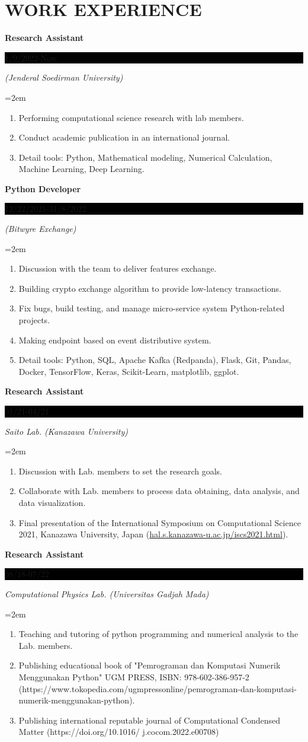 \documentclass[paper=a4,fontsize=10pt]{scrartcl} %
\newcommand{\sepspace}{\vspace*{1em}}		%
\newcommand{\NewPart}[1]{\section*{\uppercase{#1}}}
\newcommand{\EducationEntry}[4]{
		\noindent \textbf{#1} \hfill      %
		\colorbox{Black}{%
			\parbox{6em}{%
			\hfill\color{White}#2}} \par  %
		\noindent \textit{#3} \par        %
		\noindent\hangindent=2em\hangafter=0 \small #4 %
		\normalsize \par}
\begin{document}
\NewPart{Work experience}{}

\EducationEntry{Research Assistant}{1/9/2022-Now}{(Jenderal Soedirman University)}{
	\begin{enumerate}
		\item Performing computational science research with lab members.
		\item Conduct academic publication in an international journal.
		\item Detail tools: Python, Mathematical modeling, Numerical Calculation, Machine Learning, Deep Learning.
	\end{enumerate}
}


\EducationEntry{Python Developer}{12/22/2021-31/8/2022}{(Bitwyre Exchange)}{
	\begin{enumerate}
		\item Discussion with the team to deliver features exchange.
		\item Building crypto exchange algorithm to provide low-latency transactions.
		\item Fix bugs, build testing, and manage micro-service system Python-related projects.
		\item Making endpoint based on event distributive system.
		\item Detail tools: Python, SQL, Apache Kafka (Redpanda), Flask, Git, Pandas, Docker, TensorFlow, Keras, Scikit-Learn, matplotlib, ggplot.	
	\end{enumerate}
}

\sepspace

\EducationEntry{Research Assistant}{01/21-04/21}{Saito Lab. (Kanazawa University)}{
	\begin{enumerate}
		\item Discussion with Lab. members to set the research goals.
		\item Collaborate with Lab. members to process data obtaining, data analysis, and data visualization.
		\item Final presentation of the International Symposium on Computational Science 2021, Kanazawa University, Japan (\url{hal.s.kanazawa-u.ac.jp/iscs2021.html}).
	\end{enumerate}
}

\sepspace

\EducationEntry{Research Assistant}{08/18-07/22}{Computational Physics Lab. (Universitas Gadjah Mada)}{
		\begin{enumerate}
		\item Teaching and tutoring of python programming and numerical analysis to the Lab. members. 
		\item Publishing educational book of "Pemrograman dan Komputasi Numerik Menggunakan Python" UGM PRESS, ISBN: 978-602-386-957-2 (https://www.tokopedia.com/ugmpressonline/pemrograman-dan-komputasi-numerik-menggunakan-python). 
		\item Publishing international reputable journal of Computational Condensed Matter 
		(https://doi.org/10.1016/ j.cocom.2022.e00708)
	\end{enumerate}
}
\end{document}

